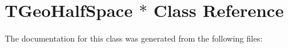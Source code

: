 \hypertarget{class_t_geo_half_space_01_5}{
\section{TGeoHalfSpace $\ast$ Class Reference}
\label{class_t_geo_half_space_01_5}
}


The documentation for this class was generated from the following files: